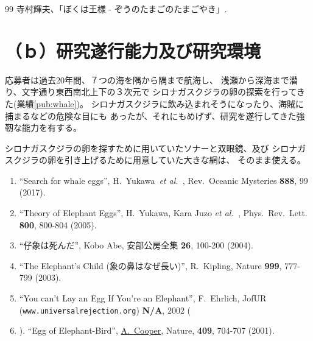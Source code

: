 \documentclass[11pt,a4j,dvipdfmx]{jarticle} 					%
\newcommand{\研究課題名}{象の卵}
\newcommand{\研究機関名}{逢坂大学}
\newcommand{\研究代表者氏名}{湯川秀樹}
\newcommand{\研究期間の最終元号年度}{7}  %
\newcommand{\paper}[6]{%
	\item ``#1'', #2, #3 {\bf #4}, #5 (#6).			%
}
\newcommand{\etal}{\textit{et al.\ }}
\newcommand{\yukawa}{H.~Yukawa}					%
\newcommand{\prl}{Phys.\ Rev.\ Lett.\ }		%
\begin{document}
	\vspace{1cm}
	\begin{thebibliography}{99}
		 寺村輝夫、「ぼくは王様 - ぞうのたまごのたまごやき」.
	\end{thebibliography}




\section{ （ｂ）研究遂行能力及び研究環境}

\PapersInstructions	%

	応募者は過去20年間、７つの海を隅から隅まで航海し、
	浅瀬から深海まで潜り、文字通り東西南北上下の３次元で
	シロナガスクジラの卵の探索を行ってきた(業績\ref{pub:whale})。
	シロナガスクジラに飲み込まれそうになったり、海賊に捕まるなどの危険な目にも
	あったが、それにもめげず、研究を遂行してきた強靭な能力を有する。

	シロナガスクジラの卵を探すために用いていたソナーと双眼鏡、及び
	シロナガスクジラの卵を引き上げるために用意していた大きな網は、
	そのまま使える。
	\begin{enumerate}
		\paper{Search for whale eggs}{\yukawa\ \etal}{Rev.\ Oceanic Mysteries}{888}{99}{2017}
			\label{pub:whale}
				
		\paper{Theory of Elephant Eggs}{\yukawa, Kara Juzo \etal}{\prl}{800}{800-804}{2005}
			\label{pub:theoegg}
				
		\paper{仔象は死んだ}{Kobo Abe}{安部公房全集}{26}{100-200}{2004}
		
		\paper{The Elephant's Child (象の鼻はなぜ長い)}{R.~Kipling}{Nature}{999}{777-799}{2003}

		\paper{You can't Lay an Egg If You're an Elephant}{F.~Ehrlich}
			{JofUR\\({\tt www.universalrejection.org})}{{\bf N/A}}{2002}
		
		\item ``Egg of Elephant-Bird'', 
				\underline{A.~Cooper},
				Nature, {\bf 409}, 704-707 (2001).	%
	\end{enumerate}
\end{document}
